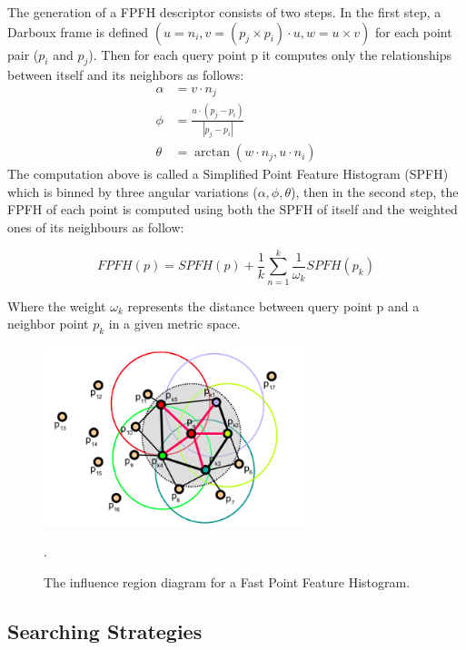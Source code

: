 The generation of a FPFH descriptor consists of two steps. In the first step, a Darboux frame is defined $(u=n_{i},v=(p_{j} \times p_{i}) \cdot u,w=u\times v)$ for each point pair ($p_{i}$ and $p_{j}$). Then for each query point p it computes only the relationships between itself and its neighbors as follows:
\begin{align}
    \alpha& = v \cdot n_{j}\nonumber \\
    \phi&= \frac{u \cdot (p_{j} - p_{i})}{|p_{j} - p_{i}|}\label{pfheq} \\
    \theta &= \arctan(w \cdot n_{j} , u \cdot n_{i})\nonumber
\end{align}
The computation above is called a Simplified Point Feature Histogram (SPFH) which is binned by three angular variations ($\alpha , \phi , \theta$), then in the second step, the FPFH of each point is computed using both the SPFH of itself and the weighted ones of its neighbours as follow:

\begin{equation}\label{fpfheq}
    FPFH(p) = SPFH(p)+\frac{1}{k}\sum\limits_{n=1}^{k}\frac{1}{\omega _{k}}SPFH(p_{k})
\end{equation}

Where the weight $\omega _{k}$ represents the distance between query point p and a neighbor point $p_{k}$ in a given metric space.

\begin{figure}[!h]
\begin{center}
\includegraphics[width=3in]{figures03/fpfh1.png}
\caption{The influence region diagram for a Fast Point Feature Histogram. \cite{algFpfh}}.
\label{fig:fpfh}
\end{center}
\end{figure}

\subsection{Searching Strategies}

